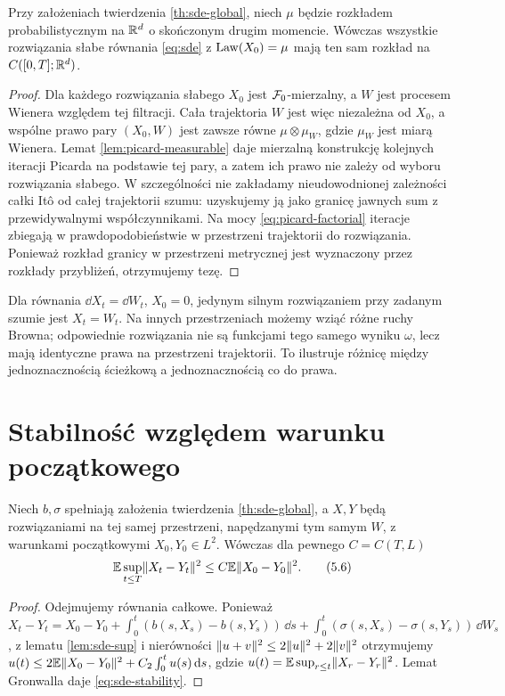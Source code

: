 \begin{wniosek}
\label{cor:sde-law}
Przy założeniach twierdzenia \ref{th:sde-global},
niech $\mu$ będzie rozkładem probabilistycznym
na $\mathbb{R}^d$ o skończonym drugim momencie.
Wówczas wszystkie rozwiązania słabe równania
\eqref{eq:sde} z $\operatorname{Law}(X_0)=\mu$ mają ten sam
rozkład na $C([0,T];\mathbb{R}^d)$.
\end{wniosek}
\begin{proof}
Dla każdego rozwiązania słabego $X_0$ jest
$\mathcal{F}_0$-mierzalny, a $W$ jest procesem Wienera
względem tej filtracji. Cała trajektoria $W$
jest więc niezależna od $X_0$, a wspólne prawo pary
$(X_0,W)$ jest zawsze równe
$\mu\otimes\mu_W$, gdzie $\mu_W$ jest miarą Wienera.
Lemat \ref{lem:picard-measurable} daje mierzalną
konstrukcję kolejnych iteracji Picarda na podstawie
tej pary, a zatem ich prawo nie zależy od wyboru
rozwiązania słabego. W szczególności nie zakładamy
nieudowodnionej zależności całki Itô od całej trajektorii
szumu: uzyskujemy ją jako granicę jawnych sum
z przewidywalnymi współczynnikami. Na mocy
\eqref{eq:picard-factorial} iteracje zbiegają w
prawdopodobieństwie w przestrzeni trajektorii
do rozwiązania. Ponieważ rozkład granicy w
przestrzeni metrycznej jest wyznaczony przez rozkłady
przybliżeń, otrzymujemy tezę.
\end{proof}

\begin{przyklad}
Dla równania $\dd X_t=\dd W_t$, $X_0=0$,
jedynym silnym rozwiązaniem przy zadanym szumie jest
$X_t=W_t$. Na innych przestrzeniach możemy wziąć
różne ruchy Browna; odpowiednie rozwiązania nie są
funkcjami tego samego wyniku $\omega$, lecz mają
identyczne prawa na przestrzeni trajektorii.
To ilustruje różnicę między jednoznacznością ścieżkową
a jednoznacznością co do prawa.
\end{przyklad}

\section{Stabilność względem warunku początkowego}
\begin{twierdzenie}
\label{th:sde-stability}
Niech $b,\sigma$ spełniają założenia twierdzenia
\ref{th:sde-global}, a $X,Y$ będą rozwiązaniami
na tej samej przestrzeni, napędzanymi tym samym $W$,
z warunkami początkowymi $X_0,Y_0\in L^2$.
Wówczas dla pewnego $C=C(T,L)$
\[
\mathbb{E}\sup_{t\le T}\lVert X_t-Y_t\rVert^2
\le C\mathbb{E}\lVert X_0-Y_0\rVert^2.
\tag{5.6}\label{eq:sde-stability}
\]
\end{twierdzenie}
\begin{proof}
Odejmujemy równania całkowe. Ponieważ
$X_t-Y_t=X_0-Y_0+\int_0^t(b(s,X_s)-b(s,Y_s))\,\dd s
+\int_0^t(\sigma(s,X_s)-\sigma(s,Y_s))\,\dd W_s$,
z lematu \ref{lem:sde-sup} i nierówności
$\lVert u+v\rVert^2\le2\lVert u\rVert^2+2\lVert v\rVert^2$
otrzymujemy
$u(t)\le2\mathbb{E}\lVert X_0-Y_0\rVert^2+C_2\int_0^t u(s)\,\mathrm{d} s$,
gdzie $u(t)=\mathbb{E}\sup_{r\le t}\lVert X_r-Y_r\rVert^2$.
Lemat Gronwalla daje \eqref{eq:sde-stability}.
\end{proof}

